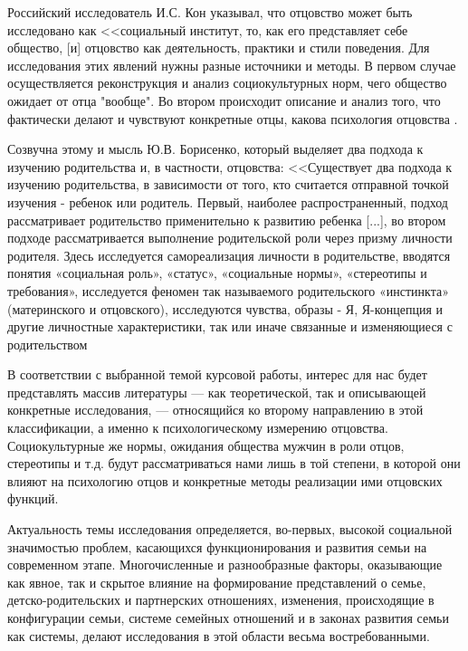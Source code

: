 \documentclass{../../common/thesisbyxetex}
\begin{document}

Российский исследователь И.С. Кон указывал, что отцовство может быть исследовано как <<социальный
институт, то, как его представляет себе общество, [и] отцовство как деятельность, практики и
стили поведения. Для исследования этих явлений нужны разные источники и методы. В первом случае
осуществляется реконструкция и анализ социокультурных норм, чего общество ожидает от отца "вообще".
Во втором происходит описание и анализ того, что фактически делают и чувствуют конкретные отцы,
какова психология отцовства \cite[3]{konot}.

Созвучна этому и мысль Ю.В. Борисенко, который выделяет два подхода к изучению родительства и, в
частности, отцовства: <<Существует два подхода к изучению родительства, в зависимости от того, кто
считается отправной точкой изучения - ребенок или родитель. Первый, наиболее распространенный,
подход рассматривает родительство применительно к развитию ребенка [...], во втором подходе
рассматривается выполнение родительской роли через призму личности родителя. Здесь исследуется
самореализация личности в родительстве, вводятся понятия «социальная роль», «статус», «социальные
нормы», «стереотипы и требования», исследуется феномен так называемого родительского «инстинкта»
(материнского и отцовского), исследуются чувства, образы - Я, Я-концепция и другие личностные
характеристики, так или иначе связанные и изменяющиеся с родительством \cite[11]{psyot}

В соответствии с выбранной темой курсовой работы, интерес для нас будет представлять массив
литературы --- как теоретической, так и описывающей конкретные исследования, --- относящийся ко
второму направлению в этой классификации, а именно к психологическому измерению отцовства.
Социокультурные же нормы, ожидания общества мужчин в роли отцов, стереотипы и т.д. будут
рассматриваться нами лишь в той степени, в которой они влияют на психологию отцов и конкретные
методы реализации ими отцовских функций.

Актуальность темы исследования определяется, во-первых, высокой социальной значимостью проблем,
касающихся функционирования и развития семьи на современном этапе. Многочисленные и разнообразные
факторы, оказывающие как явное, так и скрытое влияние на формирование представлений о семье,
детско-родительских и партнерских отношениях, изменения, происходящие в конфигурации семьи, системе
семейных отношений и в законах развития семьи как системы, делают исследования в этой области
весьма востребованными.
\end{document}
